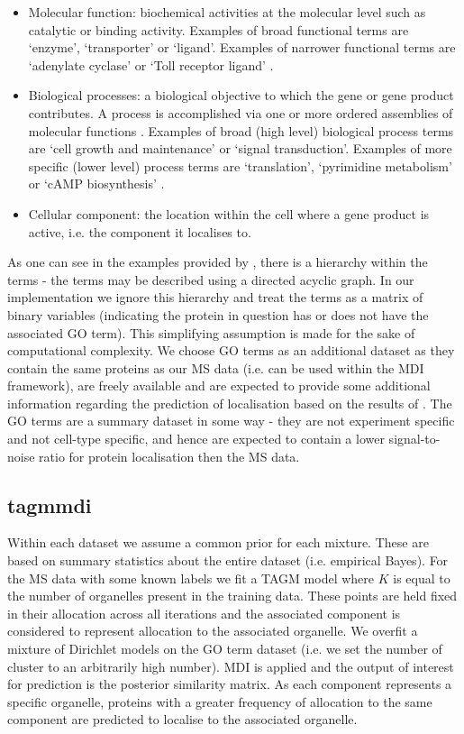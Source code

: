 \documentclass[11pt]{article} %
\begin{document}
\begin{itemize}
 \item Molecular function: biochemical activities at the molecular level such as catalytic or binding activity. Examples of broad functional terms are ‘enzyme’, ‘transporter’ or ‘ligand’. Examples of narrower functional terms are ‘adenylate cyclase’ or ‘Toll receptor ligand’ \cite{AshburnerGeneOntologytool2000}.
 \item Biological processes: a biological objective to which the gene or gene product contributes. A process is accomplished via one or more ordered assemblies of molecular functions \cite{AshburnerGeneOntologytool2000}. Examples of broad (high level) biological process terms are ‘cell growth and maintenance’ or ‘signal transduction’. Examples of more specific (lower level) process terms are ‘translation’, ‘pyrimidine metabolism’ or ‘cAMP biosynthesis’ \cite{AshburnerGeneOntologytool2000}.
 \item Cellular component: the location within the cell where a gene product is active, i.e. the component it localises to.
\end{itemize}
As one can see in the examples provided by \citet{AshburnerGeneOntologytool2000}, there is a hierarchy within the terms - the terms may be described using a directed acyclic graph. In our implementation we ignore this hierarchy and treat the terms as a matrix of binary variables (indicating the protein in question has or does not have the associated GO term). This simplifying assumption is made for the sake of computational complexity. We choose GO terms as an additional dataset as they contain the same proteins as our MS data (i.e. can be used within the MDI framework), are freely available and are expected to provide some additional information regarding the prediction of localisation based on the results of \citet{BreckelsLearningHeterogeneousData2016a}. The GO terms are a summary dataset in some way - they are not experiment specific and not cell-type specific, and hence are expected to contain a lower signal-to-noise ratio for protein localisation then the MS data.

\subsection{tagmmdi}
Within each dataset we assume a common prior for each mixture. These are based on summary statistics about the entire dataset (i.e. empirical Bayes). For the MS data with some known labels we fit a TAGM model where $K$ is equal to the number of organelles present in the training data. These points are held fixed in their allocation across all iterations and the associated component is considered to represent allocation to the associated organelle. We overfit a mixture of Dirichlet models on the GO term dataset (i.e. we set the number of cluster to an arbitrarily high number). MDI is applied and the output of interest for prediction is the posterior similarity matrix. As each component represents a specific organelle, proteins with a greater frequency of allocation to the same component are predicted to localise to the associated organelle.
\end{document}
